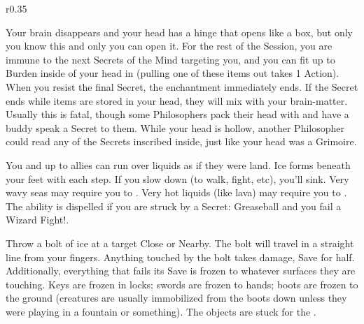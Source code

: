 \WIZARDRY[
  Name=Hollow Head,
  Link=secrets-hollow-head,
  Alignment=Biomancy,
  Save=N,
  Duration=Session,
  Counter=None ,
  Keywords=Hammerspace,
  Target=Self
]


\begin{wrapfigure}[13]{r}{0.35\textwidth}
\end{wrapfigure}


    Your brain disappears and your head has a hinge that opens like a box, but only you know this and only you can open it. For the rest of the Session,
    you are immune to the next \DICE Secrets of the Mind targeting you,  and you can fit up to \SUMDICE Burden inside of your head in  (pulling one of these items out takes 1 Action).  When you resist the final Secret, the enchantment immediately ends. If the Secret ends while items are stored in your head, they will mix with your brain-matter. Usually this is fatal, though some Philosophers pack their head with  and have a buddy speak a  Secret to them. While your head is hollow, another Philosopher could read any of the Secrets inscribed inside, just like your head was a Grimoire.

\newpage

\WIZARDRY[
  Name=Ice Bridge Step,
  Link=secrets-ice-bridge-step,
  Alignment=Elements,
  Save=N,
  Duration=Session,
  Counter=\mylink{Greaseball}{secrets-greaseball} ,
  Keywords=None,
  Target=Self
]

You and up to  allies can run over liquids as if they were land.  Ice forms beneath your feet with each step. If you slow down (to walk, fight,
etc), you'll sink. Very wavy seas may require you to \RSTRY{\DEX}.  Very hot liquids (like lava) may require you to \RSTRY{\INT}.  The ability is dispelled if you are struck by a Secret: Greaseball and you fail a Wizard Fight!.

\WIZARDRY[
  Name=Icebolt,
  Link=secrets-icebolt,
  Alignment=Elements,
  Save=Y (half),
  Duration=\DICE,
  Counter=None ,
  Keywords=None,
  Target=Close or Nearby point (straight line)
]

Throw a bolt of ice at a target Close or Nearby.  The bolt will travel in a straight line from your fingers.  Anything touched by the bolt takes
\SUMDICE damage, Save for half.  Additionally, everything that fails its Save is frozen to whatever surfaces they are touching.  Keys are frozen in
locks; swords are frozen to hands; boots are frozen to the ground (creatures are usually immobilized from the boots down unless they were
playing in a fountain or something).  The objects are stuck for the \Duration.

